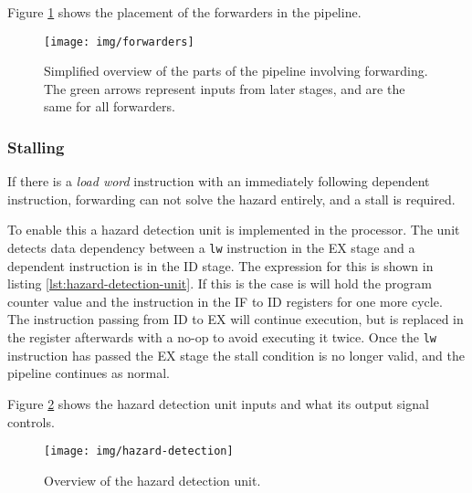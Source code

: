 Figure \ref{fig:forwarders} shows the placement of the forwarders in the pipeline.

\begin{figure}[h]
    \centering
    \texttt{[image: img/forwarders]}
    \caption{Simplified overview of the parts of the pipeline involving forwarding. The green arrows represent inputs from later stages, and are the same for all forwarders.}
    \label{fig:forwarders}
\end{figure}

\subsubsection{Stalling}
If there is a \textit{load word} instruction with an immediately following dependent instruction,
forwarding can not solve the hazard entirely, and a stall is required.

To enable this a hazard detection unit is implemented in the processor.
The unit detects data dependency between a \texttt{lw} instruction in the EX stage and a dependent instruction is in the ID stage.
The expression for this is shown in listing \ref{lst:hazard-detection-unit}.
If this is the case is will hold the program counter value and the instruction in the IF to ID registers for one more cycle.
The instruction passing from ID to EX will continue execution,
but is replaced in the register afterwards with a no-op to avoid executing it twice.
Once the \texttt{lw} instruction has passed the EX stage the stall condition is no longer valid,
and the pipeline continues as normal.

Figure \ref{fig:hazard-detection} shows the hazard detection unit inputs and what its output signal controls.

\begin{figure}[h]
    \centering
    \texttt{[image: img/hazard-detection]}
    \caption{
      Overview of the hazard detection unit.
    }
    \label{fig:hazard-detection}
\end{figure}


